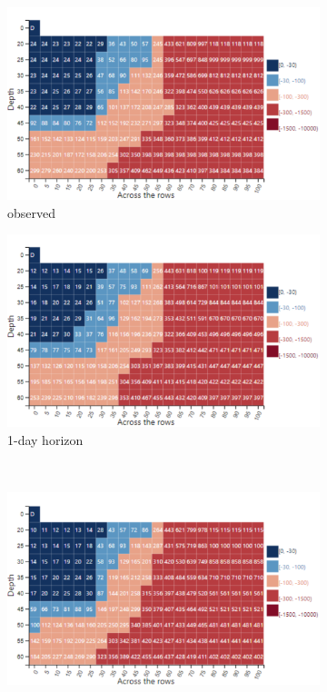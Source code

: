 \begin{figure}[t]
    \begin{subfigure}[b]{0.47\textwidth}
        \includegraphics[width=\textwidth]{chapters/physics-aware/orchard/img/obs_profile.pdf}
        \caption{observed}
        \label{orchard-fig:profile_a}
    \end{subfigure}
    \hfill
    \begin{subfigure}[b]{0.47\textwidth}
        \includegraphics[width=\textwidth]{chapters/physics-aware/orchard/img/1gg_profile.pdf}
        \caption{1-day horizon}
        \label{orchard-fig:profile_b}
    \end{subfigure}
    \\
    \begin{subfigure}[b]{0.47\textwidth}
        \includegraphics[width=\textwidth]{chapters/physics-aware/orchard/img/3gg_profile.pdf}

\end{subfigure}
\end{figure}
